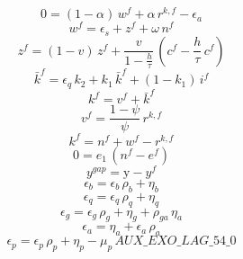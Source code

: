 \begin{dmath}
0=\left(1-{{\alpha}}\right)\, {{w^{f}}}+{{\alpha}}\, {{r^{k,f}}}-{{\epsilon_{a}}}
\end{dmath}
\begin{dmath}
{{w^{f}}}={{\epsilon_{s}}}+{{z^{f}}}+{{\omega}}\, {{n^{f}}}
\end{dmath}
\begin{dmath}
{{z^{f}}}=\left(1-{{v}}\right)\, {{z^{f}}}+\frac{{{v}}}{1-\frac{{{h}}}{{{\tau}}}}\, \left({{c^{f}}}-\frac{{{h}}}{{{\tau}}}\, {{c^{f}}}\right)
\end{dmath}
\begin{dmath}
{{\bar{k}^{f}}}={{\epsilon_{q}}}\, {{k_{2}}}+{{k_{1}}}\, {{\bar{k}^{f}}}+\left(1-{{k_{1}}}\right)\, {{i^{f}}}
\end{dmath}
\begin{dmath}
{{k^{f}}}={{v^{f}}}+{{\bar{k}^{f}}}
\end{dmath}
\begin{dmath}
{{v^{f}}}=\frac{1-{{\psi}}}{{{\psi}}}\, {{r^{k,f}}}
\end{dmath}
\begin{dmath}
{{k^{f}}}={{n^{f}}}+{{w^{f}}}-{{r^{k,f}}}
\end{dmath}
\begin{dmath}
0={{e_{1}}}\, \left({{n^{f}}}-{{e^{f}}}\right)
\end{dmath}
\begin{dmath}
{{y^{gap}}}={{\mathrm{y}}}-{{y^{f}}}
\end{dmath}
\begin{dmath}
{{\epsilon_{b}}}={{\epsilon_{b}}}\, {{\rho_{b}}}+{{\eta_{b}}}
\end{dmath}
\begin{dmath}
{{\epsilon_{q}}}={{\epsilon_{q}}}\, {{\rho_{q}}}+{{\eta_{q}}}
\end{dmath}
\begin{dmath}
{{\epsilon_{g}}}={{\epsilon_{g}}}\, {{\rho_{g}}}+{{\eta_{g}}}+{{\rho_{ga}}}\, {{\eta_{a}}}
\end{dmath}
\begin{dmath}
{{\epsilon_{a}}}={{\eta_{a}}}+{{\epsilon_{a}}}\, {{\rho_{a}}}
\end{dmath}
\begin{dmath}
{{\epsilon_{p}}}={{\epsilon_{p}}}\, {{\rho_{p}}}+{{\eta_{p}}}-{{\mu_{p}}}\, {AUX\_EXO\_LAG\_54\_0}
\end{dmath}
